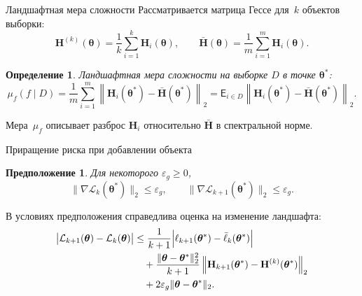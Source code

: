 \documentclass[10pt,pdf,hyperref={unicode}]{beamer}
\newtheorem{rusdefinition}{Определение}
\newtheorem{rusassumption}{Предположение}
\begin{document}
\begin{frame}{Ландшафтная мера сложности}
\justifying
Рассматривается матрица Гессе для~$k$ объектов выборки:
\[
    \mathbf{H}^{(k)}(\boldsymbol{\theta})
    =\frac{1}{k}\sum_{i=1}^{k}\mathbf{H}_i(\boldsymbol{\theta}),
    \qquad
    \bar{\mathbf{H}}(\boldsymbol{\theta})
    =\frac{1}{m}\sum_{i=1}^{m}\mathbf{H}_i(\boldsymbol{\theta}) .
\]

\begin{rusdefinition}
Ландшафтная мера сложности на выборке $D$ в точке $\boldsymbol{\theta}^*$:
\[
    \mu_f(f\mid D)
    =\frac{1}{m}\sum_{i=1}^{m}
    \left\|
    \mathbf{H}_{i}(\boldsymbol{\theta}^*)
    -\bar{\mathbf{H}}(\boldsymbol{\theta}^*)
    \right\|_2
    =\mathsf{E}_{i\in D}\left\|
    \mathbf{H}_{i}(\boldsymbol{\theta}^*)
    -\bar{\mathbf{H}}(\boldsymbol{\theta}^*)
    \right\|_2 .
\]
\end{rusdefinition}

Мера~$\mu_f$ описывает разброс $\mathbf{H}_i$ относительно $\bar{\mathbf{H}}$ в спектральной норме.
\end{frame}

\begin{frame}{Приращение риска при добавлении объекта}
\justifying
\begin{rusassumption}
Для некоторого $\varepsilon_g\ge 0$,
\[
  \bigl\|\nabla \mathcal{L}_k(\boldsymbol{\theta}^*)\bigr\|_2 \le \varepsilon_g,
  \qquad
  \bigl\|\nabla \mathcal{L}_{k+1}(\boldsymbol{\theta}^*)\bigr\|_2 \le \varepsilon_g .
\]
\end{rusassumption}

В условиях предположения справедлива оценка на изменение ландшафта:
\[\begin{aligned}
  \bigl|\mathcal{L}_{k+1}(\boldsymbol{\theta})-\mathcal{L}_k(\boldsymbol{\theta})\bigr|
  &\le \frac{1}{k+1}\Bigl|\ell_{k+1}(\boldsymbol{\theta}^*)-\bar{\ell}_k(\boldsymbol{\theta}^*)\Bigr| \\
  &\quad + \frac{\|\boldsymbol{\theta}-\boldsymbol{\theta}^*\|_2^2}{k+1}
    \left\| \mathbf{H}_{k+1}(\boldsymbol{\theta}^*)-\mathbf{H}^{(k)}(\boldsymbol{\theta}^*) \right\|_2 \\
  &\quad + 2\varepsilon_g\|\boldsymbol{\theta}-\boldsymbol{\theta}^*\|_2 .
\end{aligned}\]
\end{frame}
\end{document}
